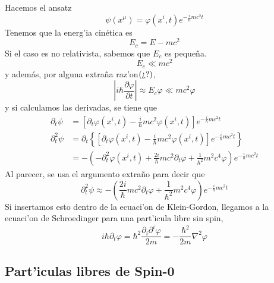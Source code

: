 Hacemos el ansatz
\begin{equation}
\psi\left(  x^{\mu}\right)  =\varphi\left(  x^{i},t\right)  e^{-\frac{i}%
{\hbar}mc^{2}t}%
\end{equation}
Tenemos que la energ'ia cin\'{e}tica es
\begin{equation}
E_{c}=E-mc^{2}%
\end{equation}
Si el caso es no relativista, sabemos que $E_{c}$ es peque\~{n}a.
\begin{equation}
E_{c}\ll mc^{2}%
\end{equation}
y adem\'{a}s, por alguna extra\~{n}a raz'on$\left(
\text{\textquestiondown ?}\right)  $,
\begin{equation}
\left|  i\hbar\frac{\partial\varphi}{\partial t}\right|  \approx E_{c}%
\varphi\ll mc^{2}\varphi
\end{equation}
y si calculamos las derivadas, se tiene que\newline%
\begin{align*}
\partial_{t}\psi & =\left[  \partial_{t}\varphi\left(  x^{i},t\right)
-\frac{i}{\hbar}mc^{2}\varphi\left(  x^{i},t\right)  \right]  e^{-\frac
{i}{\hbar}mc^{2}t}\\
\partial_{t}^{2}\psi & =\partial_{t}\left\{  \left[  \partial_{t}%
\varphi\left(  x^{i},t\right)  -\frac{i}{\hbar}mc^{2}\varphi\left(
x^{i},t\right)  \right]  e^{-\frac{i}{\hbar}mc^{2}t}\right\} \\
& =-\left(  -\partial_{t}^{2}\varphi\left(  x^{i},t\right)  +\frac{2i}{\hbar
}mc^{2}\partial_{t}\varphi+\frac{1}{\hbar^{2}}m^{2}c^{4}%
\varphi\right)  e^{-\frac{i}{\hbar}mc^{2}t}%
\end{align*}
Al parecer, se usa el argumento extra\~{n}o para decir que
\begin{equation}
\partial_{t}^{2}\psi\approx-\left(  \frac{2i}{\hbar}mc^{2}\partial
_{t}\varphi+\frac{1}{\hbar^{2}}m^{2}c^{4}\varphi\right)  e^{-\frac
{i}{\hbar}mc^{2}t}%
\end{equation}
Si insertamos esto dentro de la ecuaci'on de Klein-Gordon, llegamos a la
ecuaci'on de Schroedinger para una part'icula libre sin spin,
\begin{equation}
i\hbar\partial_{t}\varphi=\hbar^{2}\frac{\partial_{i}\partial^{i}\varphi
}{2m}=-\frac{\hbar^{2}}{2m}\nabla^{2}\varphi
\end{equation}


\subsection{Part'iculas libres de Spin-0}

